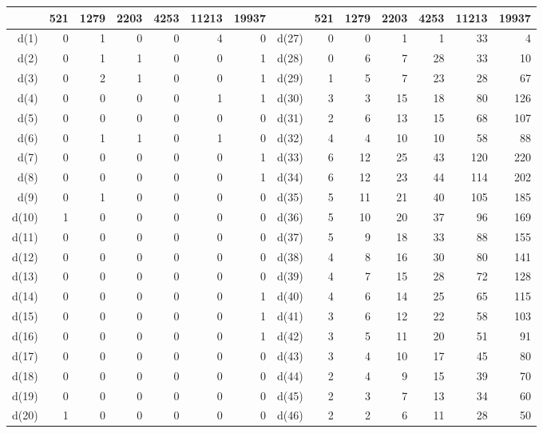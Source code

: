 \documentclass{svmult}
\begin{document}
\begin{table}
  \begin{center}
    \begin{tabular}{|r|rrrrrr||r|rrrrrr|} \hline
      & 521 & 1279 & 2203 & 4253 & 11213 & 19937 
      & & 521 & 1279 & 2203 & 4253 & 11213 & 19937 \\ \hline
      d(1) & 0 & 1 & 0 & 0 & 4 & 0 & d(27) & 0 & 0 & 1 & 1 & 33 & 4 \\
      d(2) & 0 & 1 & 1 & 0 & 0 & 1 & d(28) & 0 & 6 & 7 & 28 & 33 & 10 \\
      d(3) & 0 & 2 & 1 & 0 & 0 & 1 & d(29) & 1 & 5 & 7 & 23 & 28 & 67 \\
      d(4) & 0 & 0 & 0 & 0 & 1 & 1 & d(30) & 3 & 3 & 15 & 18 & 80 & 126 \\
      d(5) & 0 & 0 & 0 & 0 & 0 & 0 & d(31) & 2 & 6 & 13 & 15 & 68 & 107 \\
      d(6) & 0 & 1 & 1 & 0 & 1 & 0 & d(32) & 4 & 4 & 10 & 10 & 58 & 88 \\
      d(7) & 0 & 0 & 0 & 0 & 0 & 1 & d(33) & 6 & 12 & 25 & 43 & 120 & 220 \\
      d(8) & 0 & 0 & 0 & 0 & 0 & 1 & d(34) & 6 & 12 & 23 & 44 & 114 & 202 \\
      d(9) & 0 & 1 & 0 & 0 & 0 & 0 & d(35) & 5 & 11 & 21 & 40 & 105 & 185 \\
      d(10) & 1 & 0 & 0 & 0 & 0 & 0 & d(36) & 5 & 10 & 20 & 37 & 96 & 169 \\
      d(11) & 0 & 0 & 0 & 0 & 0 & 0 & d(37) & 5 & 9 & 18 & 33 & 88 & 155 \\
      d(12) & 0 & 0 & 0 & 0 & 0 & 0 & d(38) & 4 & 8 & 16 & 30 & 80 & 141 \\
      d(13) & 0 & 0 & 0 & 0 & 0 & 0 & d(39) & 4 & 7 & 15 & 28 & 72 & 128 \\
      d(14) & 0 & 0 & 0 & 0 & 0 & 1 & d(40) & 4 & 6 & 14 & 25 & 65 & 115 \\
      d(15) & 0 & 0 & 0 & 0 & 0 & 1 & d(41) & 3 & 6 & 12 & 22 & 58 & 103 \\
      d(16) & 0 & 0 & 0 & 0 & 0 & 1 & d(42) & 3 & 5 & 11 & 20 & 51 & 91 \\
      d(17) & 0 & 0 & 0 & 0 & 0 & 0 & d(43) & 3 & 4 & 10 & 17 & 45 & 80 \\
      d(18) & 0 & 0 & 0 & 0 & 0 & 0 & d(44) & 2 & 4 & 9 & 15 & 39 & 70 \\
      d(19) & 0 & 0 & 0 & 0 & 0 & 0 & d(45) & 2 & 3 & 7 & 13 & 34 & 60 \\
      d(20) & 1 & 0 & 0 & 0 & 0 & 0 & d(46) & 2 & 2 & 6 & 11 & 28 & 50 \\

\end{tabular}
\end{center}
\end{table}
\end{document}

